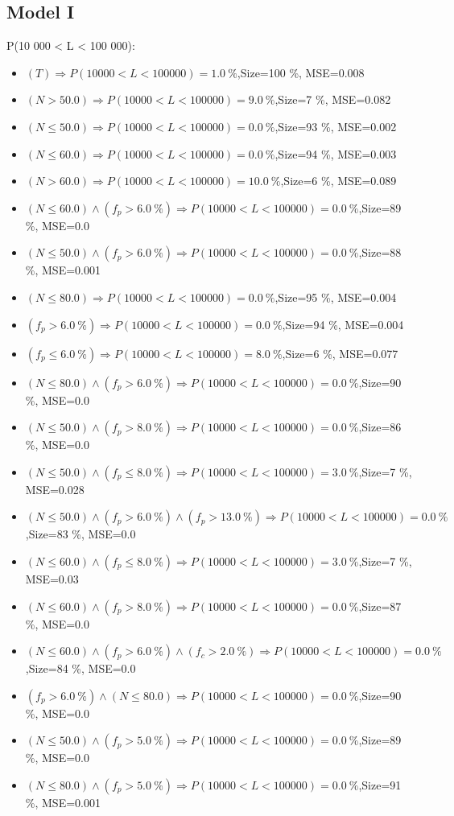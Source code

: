 \documentclass[numbered]{CSL}
\begin{document}
\subsection{Model I}
P(10 000 < L < 100 000):
\begin{itemize}
\item $(T) \Rightarrow P(10 000 < L < 100 000) = 1.0~\%$,\hfill Size=100 \%, MSE=0.008
\item $(N > 50.0) \Rightarrow P(10 000 < L < 100 000) = 9.0~\%$,\hfill Size=7 \%, MSE=0.082
\item $(N \leq 50.0) \Rightarrow P(10 000 < L < 100 000) = 0.0~\%$,\hfill Size=93 \%, MSE=0.002
\item $(N \leq 60.0) \Rightarrow P(10 000 < L < 100 000) = 0.0~\%$,\hfill Size=94 \%, MSE=0.003
\item $(N > 60.0) \Rightarrow P(10 000 < L < 100 000) = 10.0~\%$,\hfill Size=6 \%, MSE=0.089
\item $(N \leq 60.0) \land (f_p > 6.0~\%) \Rightarrow P(10 000 < L < 100 000) = 0.0~\%$,\hfill Size=89 \%, MSE=0.0
\item $(N \leq 50.0) \land (f_p > 6.0~\%) \Rightarrow P(10 000 < L < 100 000) = 0.0~\%$,\hfill Size=88 \%, MSE=0.001
\item $(N \leq 80.0) \Rightarrow P(10 000 < L < 100 000) = 0.0~\%$,\hfill Size=95 \%, MSE=0.004
\item $(f_p > 6.0~\%) \Rightarrow P(10 000 < L < 100 000) = 0.0~\%$,\hfill Size=94 \%, MSE=0.004
\item $(f_p \leq 6.0~\%) \Rightarrow P(10 000 < L < 100 000) = 8.0~\%$,\hfill Size=6 \%, MSE=0.077
\item $(N \leq 80.0) \land (f_p > 6.0~\%) \Rightarrow P(10 000 < L < 100 000) = 0.0~\%$,\hfill Size=90 \%, MSE=0.0
\item $(N \leq 50.0) \land (f_p > 8.0~\%) \Rightarrow P(10 000 < L < 100 000) = 0.0~\%$,\hfill Size=86 \%, MSE=0.0
\item $(N \leq 50.0) \land (f_p \leq 8.0~\%) \Rightarrow P(10 000 < L < 100 000) = 3.0~\%$,\hfill Size=7 \%, MSE=0.028
\item $(N \leq 50.0) \land (f_p > 6.0~\%) \land (f_p > 13.0~\%) \Rightarrow P(10 000 < L < 100 000) = 0.0~\%$,\hfill Size=83 \%, MSE=0.0
\item $(N \leq 60.0) \land (f_p \leq 8.0~\%) \Rightarrow P(10 000 < L < 100 000) = 3.0~\%$,\hfill Size=7 \%, MSE=0.03
\item $(N \leq 60.0) \land (f_p > 8.0~\%) \Rightarrow P(10 000 < L < 100 000) = 0.0~\%$,\hfill Size=87 \%, MSE=0.0
\item $(N \leq 60.0) \land (f_p > 6.0~\%) \land (f_c > 2.0~\%) \Rightarrow P(10 000 < L < 100 000) = 0.0~\%$,\hfill Size=84 \%, MSE=0.0
\item $(f_p > 6.0~\%) \land (N \leq 80.0) \Rightarrow P(10 000 < L < 100 000) = 0.0~\%$,\hfill Size=90 \%, MSE=0.0
\item $(N \leq 50.0) \land (f_p > 5.0~\%) \Rightarrow P(10 000 < L < 100 000) = 0.0~\%$,\hfill Size=89 \%, MSE=0.0
\item $(N \leq 80.0) \land (f_p > 5.0~\%) \Rightarrow P(10 000 < L < 100 000) = 0.0~\%$,\hfill Size=91 \%, MSE=0.001
\end{itemize}
\end{document}
